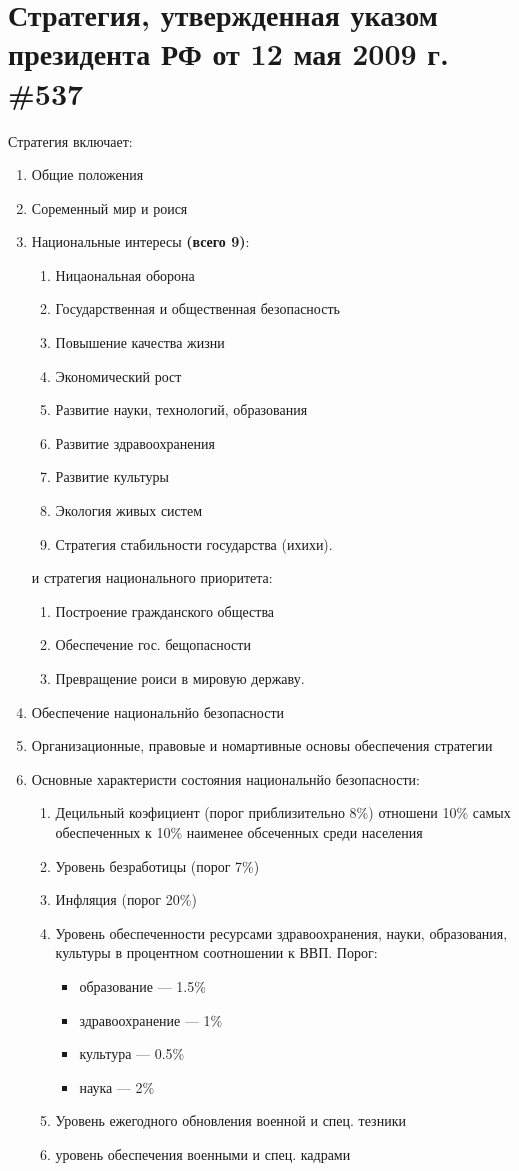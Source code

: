\textsl{}\documentclass[oneside,final,14pt]{extreport}
\begin{document}
\section*{Стратегия, утвержденная указом президента РФ от 12 мая 2009 г. \#537}
Стратегия включает:
\begin{enumerate}
	\item Общие положения
	\item Соременный мир и роися
	\item Национальные интересы \textbf{(всего 9)}:
	\begin{enumerate}
		\item Ницаональная оборона
		\item Государственная и общественная безопасность
		\item Повышение качества жизни
		\item Экономический рост
		\item Развитие науки, технологий, образования
		\item Развитие здравоохранения
		\item Развитие культуры
		\item Экология живых систем
		\item Стратегия стабильности государства (ихихи).
	\end{enumerate}
	и стратегия национального приоритета:
	\begin{enumerate}
		\item Построение гражданского общества
		\item Обеспечение гос. бещопасности
		\item Превращение роиси в мировую державу.
	\end{enumerate}
	\item Обеспечение национальнйо безопасности
	\item Организационные, правовые и номартивные основы обеспечения стратегии
	\item Основные характеристи состояния национальнйо безопасности:
	\begin{enumerate}
		\item Децильный коэфициент (порог приблизительно 8\%) отношени 10\% самых обеспеченных к 10\% наименее обсеченных среди населения
		\item Уровень безработицы (порог 7\%)
		\item Инфляция (порог 20\%)
		\item Уровень обеспеченности ресурсами здравоохранения, науки, образования, культуры в процентном соотношении к ВВП. Порог:
		\begin{itemize}
			\item образование --- 1.5\%
			\item здравоохранение --- 1\%
			\item культура --- 0.5\%
			\item наука --- 2\%
		\end{itemize}
		\item Уровень ежегодного обновления военной и спец. тезники
		\item уровень обеспечения военными и спец. кадрами
	\end{enumerate}
\end{enumerate}
\end{document}
